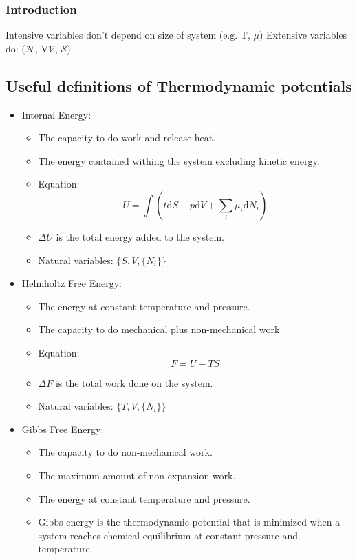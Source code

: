 \documentclass[11pt]{article}
\begin{document}
\subsubsection{Introduction}
\label{sec:orge157789}
Intensive variables don't depend on size of system (e.g. T, \(\mu\))
Extensive variables do: (\(\mathcal{N}\), V\(\mathcal{V}\), \(\mathcal{S}\))
\subsection{Useful definitions of Thermodynamic potentials}
\label{sec:orgdc98479}
\begin{itemize}
\item Internal Energy:
\begin{itemize}
\item The capacity to do work and release heat.
\item The energy contained withing the system excluding kinetic energy.
\item Equation: \[ U = \int ( t\text{d}S -p\text{d}V + \sum_{i}\mu_{i}\text{d}N_{i} ) \]
\item \(\Delta U\) is the total energy added to the system.
\item Natural variables: \(\{ S, V, \{N_{i}\} \}\)
\end{itemize}
\item Helmholtz Free Energy:
\begin{itemize}
\item The energy at constant temperature and pressure.
\item The capacity to do mechanical plus non-mechanical work
\item Equation: \[ F = U - TS \]
\item \(\Delta F\) is the total work done on the system.
\item Natural variables: \(\{ T, V, \{N_{i}\} \}\)
\end{itemize}
\item Gibbs Free Energy:
\begin{itemize}
\item The capacity to do non-mechanical work.
\item The maximum amount of non-expansion work.
\item The energy at constant temperature and pressure.
\item Gibbs energy is the thermodynamic potential that is minimized when a
system reaches chemical equilibrium at constant pressure and
temperature.
\end{itemize}

\end{itemize}
\end{document}

